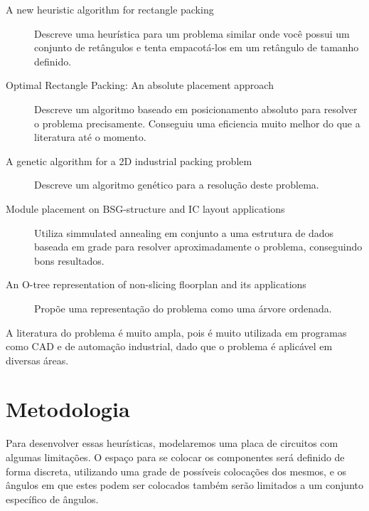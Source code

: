 \documentclass[12pt]{article}
\begin{document}
    \begin{description}
        \item[A new heuristic algorithm for rectangle packing ~\cite{HUANG20073270}] Descreve uma heurística para um problema similar onde
            você possui um conjunto de retângulos e tenta empacotá-los em um retângulo de tamanho definido.
        \item[Optimal Rectangle Packing: An absolute placement approach ~\cite{DBLP:journals/corr/HuangK14}] Descreve um algoritmo baseado
            em posicionamento absoluto para resolver o problema precisamente. Conseguiu uma eficiencia muito melhor do que a literatura até o momento.
        \item[A genetic algorithm for a 2D industrial packing problem ~\cite{HOPPER1999375}] Descreve um algoritmo genético para a resolução
            deste problema.
        \item[Module placement on BSG-structure and IC layout applications ~\cite{10.5555/244522.244865}] Utiliza simmulated annealing em conjunto
            a uma estrutura de dados baseada em grade para resolver aproximadamente o problema, conseguindo bons resultados.
        \item[An O-tree representation of non-slicing floorplan and its applications ~\cite{10.1145/309847.309928}] Propõe uma representação do problema como uma árvore ordenada.
    \end{description}

    A literatura do problema é muito ampla, pois é muito utilizada em programas como CAD e de automação industrial, dado que o problema é aplicável
    em diversas áreas.

    \section{Metodologia} %
    \label{sec:Metodologia}
        Para desenvolver essas heurísticas, modelaremos uma placa de circuitos com algumas limitações. O espaço para se colocar os componentes
        será definido de forma discreta, utilizando uma grade de possíveis colocações dos mesmos, e os ângulos em que estes podem ser colocados
        também serão limitados a um conjunto específico de ângulos.

\end{document}
